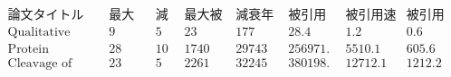 \[\begin{array}{cccccccc}
 \text{論文タイトル（先頭のみ）} & \text{最大被引用を得るまでの期間} & \text{減衰期間} & \text{最大被引用数（年間）} & \text{減衰年の被引用数} & \text{被引用数分散}
& \text{被引用速度の分散} & \text{被引用か速度の分散} \\
 \text{Qualitative analysis of ...} & 9 & 5 & 23 & 177 & 28.4 & 1.2 & 0.6 \\
 \text{Protein measurement with ...} & 28 & 10 & 1740 & 29743 & 256971. & 5510.1 & 605.6 \\
 \text{Cleavage of structural proteins ...} & 23 & 5 & 2261 & 32245 & 380198. & 12712.1 & 1212.2 \\
\end{array}\]

